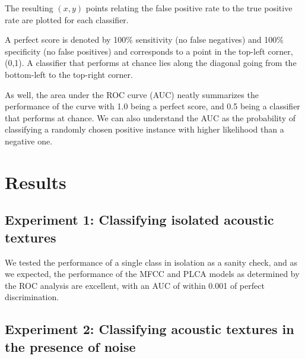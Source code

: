 \documentclass[a4paper,10pt,final]{ThesisStyle}
\begin{document}
The resulting $(x,y)$ points relating the false positive rate to the true positive rate are plotted for each classifier.

A perfect score is denoted by 100\% sensitivity (no false negatives) and 100\% specificity (no false positives) and corresponds to a point in the top-left corner, (0,1).  A classifier that performs at chance lies along the diagonal going from the bottom-left to the top-right corner.  

As well, the area under the ROC curve (AUC) neatly summarizes the performance of the curve with 1.0 being a perfect score, and 0.5 being a classifier that performs at chance.  We can also understand the AUC as the probability of classifying a randomly chosen positive instance with higher likelihood than a negative one.

\section{Results}

\subsection*{Experiment 1: Classifying isolated acoustic textures}

We tested the performance of a single class in isolation as a sanity check, and as we expected, the performance of the MFCC and PLCA models as determined by the ROC analysis are excellent, with an AUC of within 0.001 of perfect discrimination.




\subsection*{Experiment 2: Classifying acoustic textures in the presence of noise}
\end{document}
